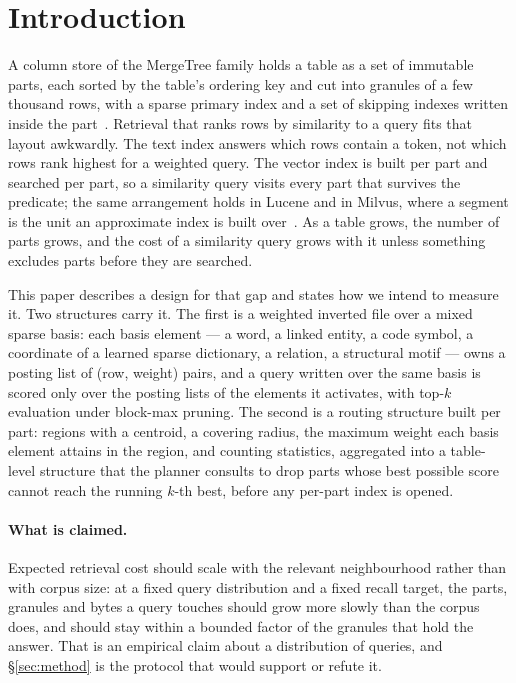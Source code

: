 \section{Introduction}
\label{sec:intro}

A column store of the MergeTree family holds a table as a set of immutable
parts, each sorted by the table's ordering key and cut into granules of a few
thousand rows, with a sparse primary index and a set of skipping indexes
written inside the part~\cite{schulze2024clickhouse,clickhousedocs}. Retrieval
that ranks rows by similarity to a query fits that layout awkwardly. The text
index answers which rows contain a token, not which rows rank highest for a
weighted query. The vector index is built per part and searched per part, so a
similarity query visits every part that survives the predicate; the same
arrangement holds in Lucene and in Milvus, where a segment is the unit an
approximate index is built over~\cite{lucene,wang2021milvus}. As a table grows,
the number of parts grows, and the cost of a similarity query grows with it
unless something excludes parts before they are searched.

This paper describes a design for that gap and states how we intend to measure
it. Two structures carry it. The first is a weighted inverted file over a mixed
sparse basis: each basis element --- a word, a linked entity, a code symbol, a
coordinate of a learned sparse dictionary, a relation, a structural motif ---
owns a posting list of (row, weight) pairs, and a query written over the same
basis is scored only over the posting lists of the elements it activates, with
top-$k$ evaluation under block-max pruning. The second is a routing structure
built per part: regions with a centroid, a covering radius, the maximum weight
each basis element attains in the region, and counting statistics, aggregated
into a table-level structure that the planner consults to drop parts whose best
possible score cannot reach the running $k$-th best, before any per-part index
is opened.

\paragraph{What is claimed.}
Expected retrieval cost should scale with the relevant neighbourhood rather
than with corpus size: at a fixed query distribution and a fixed recall target,
the parts, granules and bytes a query touches should grow more slowly than the
corpus does, and should stay within a bounded factor of the granules that hold
the answer. That is an empirical claim about a distribution of queries, and
\S\ref{sec:method} is the protocol that would support or refute it.


